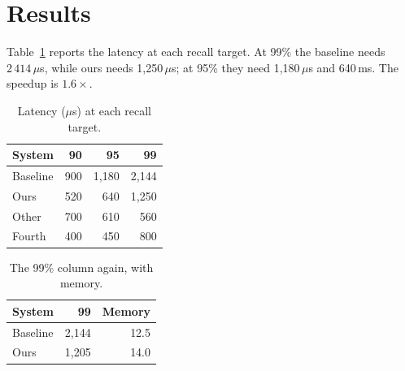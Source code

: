 \documentclass{article}
\begin{document}
\begin{abstract}
Our index answers queries with a speedup of up to $3.7\times$ over the baseline.
\end{abstract}
\section{Results}
Table~\ref{tab:lat} reports the latency at each recall target. At 99\% the baseline needs $2\,414\,\mu$s,
while ours needs 1,250\,$\mu$s; at 95\% they need 1,180\,$\mu$s and 640\,ms. The speedup is $1.6\times$.
\begin{table}[h]
\centering
\caption{Latency ($\mu$s) at each recall target.}
\label{tab:lat}
\begin{tabular}{lrrr}
\toprule
System & 90 & 95 & 99 \\
\midrule
Baseline & 900 & 1,180 & 2,144 \\
Ours & 520 & 640 & 1,250 \\
Other & 700 & 610 & 560 \\
Fourth & 400 & 450 & 800 \\
\bottomrule
\end{tabular}
\end{table}
\begin{table}[h]
\centering
\caption{The 99\% column again, with memory.}
\begin{tabular}{lrr}
\toprule
System & 99 & Memory \\
\midrule
Baseline & 2,144 & 12.5 \\
Ours & 1,205 & 14.0 \\
\bottomrule
\end{tabular}
\end{table}
\end{document}
